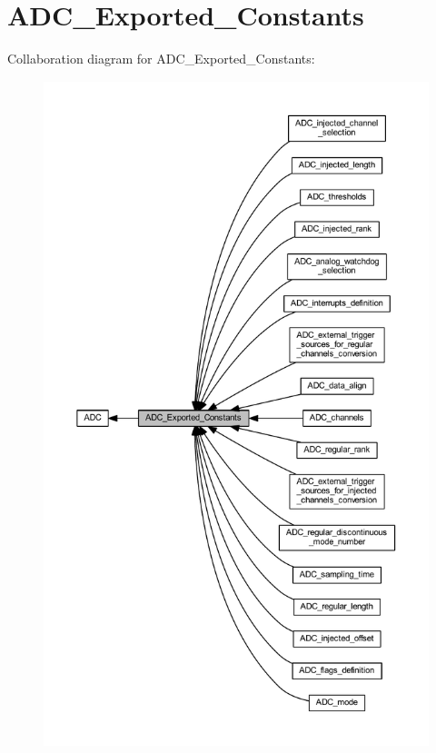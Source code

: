 \hypertarget{group___a_d_c___exported___constants}{}\section{A\+D\+C\+\_\+\+Exported\+\_\+\+Constants}
\label{group___a_d_c___exported___constants}
Collaboration diagram for A\+D\+C\+\_\+\+Exported\+\_\+\+Constants\+:
\nopagebreak
\begin{figure}[H]
\begin{center}
\leavevmode
\includegraphics[height=550pt]{group___a_d_c___exported___constants}
\end{center}
\end{figure}
